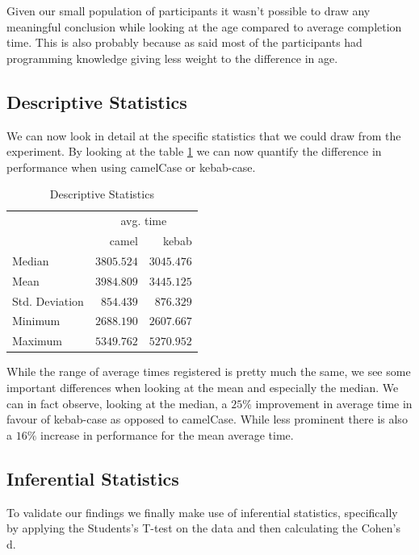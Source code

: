 \documentclass{article}
\begin{document}
Given our small population of participants it wasn't possible to draw any meaningful conclusion while looking at the age compared to average
completion time. This is also probably because as said most of the participants had programming knowledge giving less weight to the difference in age.

\subsection{Descriptive Statistics}
We can now look in detail at the specific statistics that we could draw from the experiment. By looking at the table \ref{tab:descriptiveStatistics} we can now 
quantify the difference in performance when using camelCase or kebab-case.

\begin{table}[h]
    \centering
    \caption{Descriptive Statistics}
    \label{tab:descriptiveStatistics}
    {
        \begin{tabular}{lrr}
            \toprule
            \multicolumn{1}{c}{} & \multicolumn{2}{c}{avg. time} \\
            \cline{2-3}
             & camel & kebab  \\
            \cmidrule[0.4pt]{1-3}
            Median & $3805.524$ & $3045.476$  \\
            Mean & $3984.809$ & $3445.125$  \\
            Std. Deviation & $854.439$ & $876.329$  \\
            Minimum & $2688.190$ & $2607.667$  \\
            Maximum & $5349.762$ & $5270.952$  \\
            \bottomrule
        \end{tabular}
    }
\end{table}

While the range of average times registered is pretty much the same, we see some important differences when looking at the mean and especially the median.
We can in fact observe, looking at the median, a $25\%$ improvement in average time in favour of kebab-case as opposed to camelCase. While less prominent there is 
also a $16\%$ increase in performance for the mean average time.

\subsection{Inferential Statistics}
To validate our findings we finally make use of inferential statistics, specifically by applying the Students's T-test on the data and then 
calculating the Cohen's d. 
\end{document}

